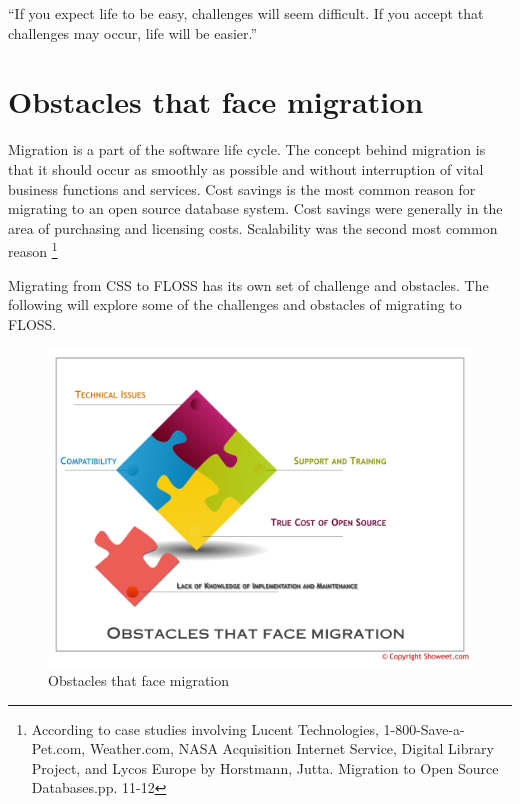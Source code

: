  \newpage
 \begin{savequote}[108mm]
“If you expect life to be easy, challenges will seem difficult. If you accept that challenges may occur, life will be easier.” 
\end{savequote}
 \chapter{Obstacles that face migration}
 \label{chap:Obstacles}
 \vspace{-2cm}
 Migration is a part of the software life cycle. The concept behind migration is that it should occur as smoothly as possible and without interruption of vital business functions and services.
 Cost savings is the most common reason for migrating to an open source database system. Cost savings were generally in the area of purchasing and licensing costs. Scalability was the second most common reason  \footnote{According to case studies involving Lucent Technologies, 1-800-Save-a-Pet.com, Weather.com, NASA Acquisition Internet Service, Digital Library Project, and Lycos Europe by Horstmann, Jutta. Migration to Open Source Databases.pp. 11-12 }
 
 Migrating from CSS to FLOSS has its own set of challenge and obstacles. The following will explore some of the challenges and obstacles of migrating to FLOSS. 
   \begin{figure}
    \centering
        \includegraphics[scale=0.6,angle=90]{img/obsticals.png}
      \caption{Obstacles that face migration}
      \label{fig:Obstacles}
    \end{figure}


